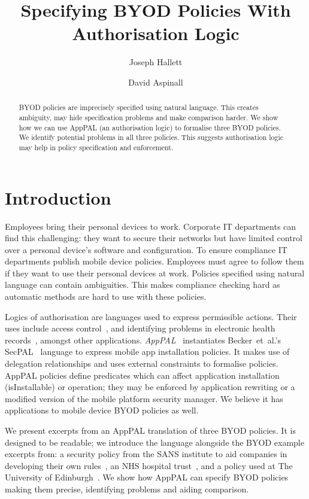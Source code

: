\documentclass{easychair}
\title{Specifying BYOD Policies With Authorisation Logic}
\author{
  Joseph Hallett%
  \and
  David Aspinall%
}
\institute{
  University of Edinburgh
}
\begin{document}
\maketitle

\begin{abstract}
  BYOD policies are imprecisely specified using natural language.
  This creates ambiguity, may hide specification problems and make comparison harder.
  We show how we can use AppPAL (an authorisation logic) to formalise three BYOD policies.
  We identify potential problems in all three policies.
  This suggests authorisation logic may help in policy specification and enforcement.
\end{abstract}

\section{Introduction}

Employees bring their personal devices to work.
Corporate IT departments can find this challenging:
  they want to secure their networks but have limited control over a personal device's software and configuration.
To ensure compliance IT departments publish mobile device policies.
Employees must agree to follow them if they want to use their personal devices at work.
Policies specified using natural language can contain ambiguities.
This makes compliance checking hard as automatic methods are hard to use with these policies.

Logics of authorisation are languages used to express permissible actions.
Their uses include access control~\cite{Abadi:2003kta}, and identifying problems in electronic health records~\cite{Becker:2004fi}, amongst other applications.
\emph{AppPAL}~\cite{Hallett:2016vu} instantiates Becker~et~al{.}'s SecPAL~\cite{Becker:2006vh} language to express mobile app installation policies.
It makes use of delegation relationships and uses external constraints to formalise policies.
AppPAL policies define predicates which can affect application installation (isInstallable) or operation;
 they may be enforced by application rewriting or a modified version of the mobile platform security manager.
We believe it has applications to mobile device BYOD policies as well.

We present excerpts from an AppPAL translation of three BYOD policies. 
It is designed to be readable; we introduce the language alongside the BYOD example excerpts from:
    a security policy from the SANS institute to aid companies in developing their own rules~\cite{Guerin:2008we}, 
    an NHS hospital trust~\cite{Kennington:2014tr},
    and a policy used at The University of Edinburgh~\cite{Williamson:2015tr}.
We show how AppPAL can specify BYOD policies making them precise, identifying problems and aiding comparison.
\end{document}
